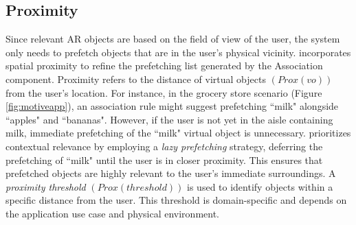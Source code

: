         \subsection{Proximity}
        \label{sssec:prox}
            Since relevant AR objects are based on the field of view of the user, the system only needs to prefetch objects that are in the user's physical vicinity. \spaarc{} incorporates spatial proximity to refine the prefetching list generated by the Association component. Proximity refers to the distance of virtual objects $(Prox(vo))$ from the user's location. For instance, in the grocery store scenario (Figure \ref{fig:motiveapp}), an association rule might suggest prefetching ``milk" alongside ``apples" and ``bananas". However, if the user is not yet in the aisle containing milk, immediate prefetching of the ``milk" virtual object is unnecessary. \spaarc{} prioritizes contextual relevance by employing a {\em lazy prefetching} strategy, deferring the prefetching of ``milk" until the user is in closer proximity. This ensures that prefetched objects are highly relevant to the user's immediate surroundings. A {\em proximity threshold} $(Prox(threshold))$ is used to identify objects within a specific distance from the user. This threshold is domain-specific and depends on the application use case and physical environment. %


            


